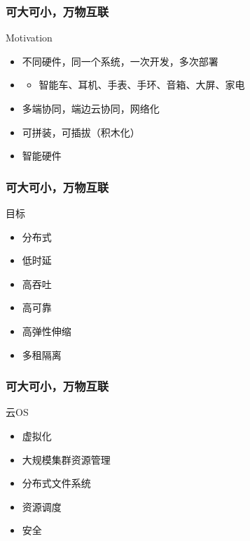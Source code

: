 \begin{frame}
\frametitle{可大可小，万物互联}
\begin{block}{Motivation}
\begin{itemize}
	\item 不同硬件，同一个系统，一次开发，多次部署
	\item 
		\begin{itemize}
		\item 智能车、耳机、手表、手环、音箱、大屏、家电
	\end{itemize} 
	\item 多端协同，端边云协同，网络化
	\item 可拼装，可插拔（积木化）
	\item 智能硬件
\end{itemize} 
\end{block}
\end{frame}

\begin{frame}
\frametitle{可大可小，万物互联}
\begin{block}{目标}
\begin{itemize}
	\item 分布式
	\item 低时延
	\item 高吞吐
	\item 高可靠
	\item 高弹性伸缩
	\item 多租隔离
\end{itemize} 
\end{block}
\end{frame}


\begin{frame}
\frametitle{可大可小，万物互联}
\begin{block}{云OS}
\begin{itemize}
	\item 虚拟化
	\item 大规模集群资源管理
	\item 分布式文件系统
	\item 资源调度
	\item 安全
\end{itemize} 
\end{block}
\end{frame}


